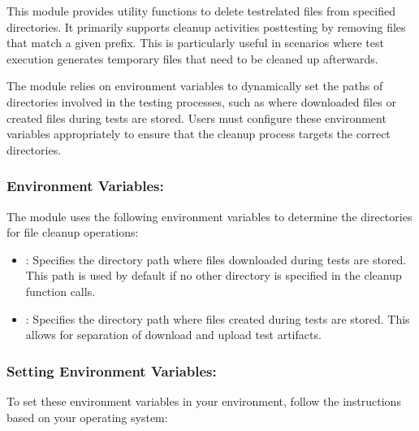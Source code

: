 \documentclass[letterpaper,10pt,english]{sphinxmanual}
\begin{document}
\begin{fulllineitems}
\label{\detokenize{cleanup:cleanup.delete_test_files.delete_files_starting_with}}
\pysigstartsignatures
{}
\pysigstopsignatures
\sphinxAtStartPar
This module provides utility functions to delete test\sphinxhyphen{}related files from specified directories. 
It primarily supports cleanup activities post\sphinxhyphen{}testing by removing files that match a given prefix. 
This is particularly useful in scenarios where test execution generates temporary files that need to be cleaned up afterwards.

\sphinxAtStartPar
The module relies on environment variables to dynamically set the paths of directories involved in the testing processes, 
such as where downloaded files or created files during tests are stored. Users must configure these environment variables 
appropriately to ensure that the cleanup process targets the correct directories.


\subsubsection{Environment Variables:}
\label{\detokenize{cleanup:environment-variables}}
\sphinxAtStartPar
The module uses the following environment variables to determine the directories for file cleanup operations:
\begin{itemize}
\item {} 
\sphinxAtStartPar
{}: Specifies the directory path where files downloaded during tests are stored. This path is used
by default if no other directory is specified in the cleanup function calls.

\item {} 
\sphinxAtStartPar
{}: Specifies the directory path where files created during tests are stored. This allows for
separation of download and upload test artifacts.

\end{itemize}


\subsubsection{Setting Environment Variables:}
\label{\detokenize{cleanup:setting-environment-variables}}
\sphinxAtStartPar
To set these environment variables in your environment, follow the instructions based on your operating system:



\end{fulllineitems}
\end{document}
